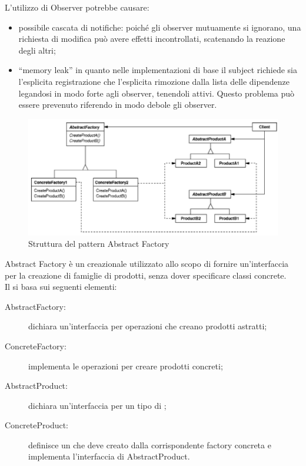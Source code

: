 			L’utilizzo di Observer potrebbe causare:
			\begin{itemize}
			\item possibile cascata di notifiche: poiché gli observer mutuamente si ignorano, una richiesta di modifica può avere effetti incontrollati, scatenando la reazione degli altri;
			\item “memory leak” in quanto nelle implementazioni di base il subject richiede sia l’esplicita registrazione che l’esplicita rimozione dalla lista delle dipendenze legandosi in modo forte agli observer, tenendoli attivi. Questo problema può essere prevenuto riferendo in modo debole gli observer.
			\end{itemize}
 \label{app:abstractfactory}
		\begin{figure}[H]\centering
        \includegraphics[scale=0.7]{SpecificaTecnica/Pics/AbstractFactory}
        \caption{Struttura del pattern Abstract Factory}
		\end{figure}
Abstract Factory è un  creazionale utilizzato allo scopo di fornire un'interfaccia per la creazione di famiglie di prodotti, senza dover specificare classi concrete.\\
Il  si basa sui seguenti elementi:
\begin{description}
\item[AbstractFactory:] dichiara un'interfaccia per operazioni che creano prodotti astratti;
\item[ConcreteFactory:] implementa le operazioni per creare prodotti concreti;
\item[AbstractProduct:] dichiara un'interfaccia per un tipo di ;
\item[ConcreteProduct:] definisce un  che deve creato dalla corrispondente factory concreta e implementa l'interfaccia di AbstractProduct.
\end{description}

